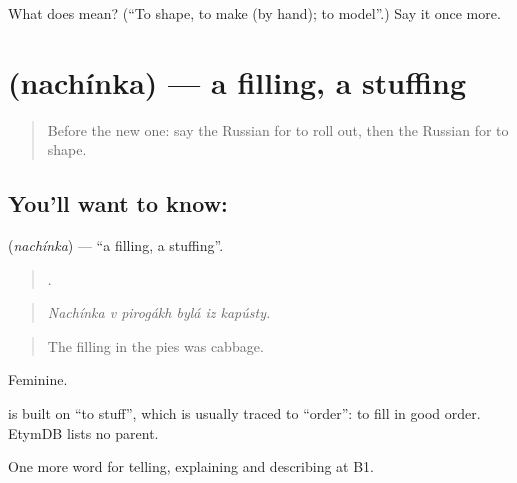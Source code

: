 \begin{tcolorbox}[breakable,colback=teal!4,colframe=teal!35!black,title={Before you move on}]
What does  mean? (\textquotedblleft{}To shape, to make (by hand); to model\textquotedblright{}.) Say it once more.
\end{tcolorbox}
\section[\texorpdfstring{\ru{начинка} (nachínka)}{начинка (nachínka)}]{ (nachínka) — a filling, a stuffing}

\label{lesson:RU-C331-nachinka}



\begin{quote}
Before the new one: say the Russian for to roll out, then the Russian for to shape.
\end{quote}

\subsection*{You'll want to know: }
\textbf{} (\emph{nachínka}) — \textquotedblleft{}a filling, a stuffing\textquotedblright{}.

\begin{quote}
     .
\end{quote}

\begin{quote}
\emph{Nachínka v pirogákh bylá iz kapústy.}
\end{quote}

\begin{quote}
The filling in the pies was cabbage.
\end{quote}

Feminine.

\begin{cousinweb}
\emph{} is built on \emph{} \textquotedblleft{}to stuff\textquotedblright{}, which is usually traced to \emph{} \textquotedblleft{}order\textquotedblright{}: to fill in good order. EtymDB lists no parent.
\end{cousinweb}

\begin{grammarlens}[title={What you've built}]
One more word for telling, explaining and describing at B1.
\end{grammarlens}

